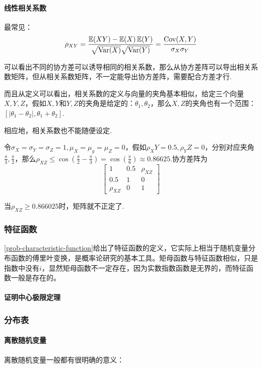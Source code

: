 \paragraph*{线性相关系数}最常见：
$$\rho_{XY}=\frac{\operatorname{\mathbb{E}}(XY)-\operatorname{\mathbb{E}}(X)\operatorname{\mathbb{E}}(Y)}{\sqrt{\operatorname{Var}(X)}\sqrt{\operatorname{Var}(Y)}}=\frac{\operatorname{Cov}(X,Y)}{\sigma_X\sigma_Y}$$

可以看出不同的协方差可以诱导相同的相关系数，那么从协方差阵可以导出相关系数矩阵，但从相关系数矩阵，不一定能导出协方差阵，需要配合方差才行.

而且从定义可以看出，相关系数的定义与向量的夹角基本相似，给定三个向量$X,Y,Z$，假如$X,Y$和$Y,Z$的夹角是给定的：$\theta_1,\theta_2$，那么$X,Z$的夹角也有一个范围：$[|\theta_1-\theta_2|,\theta_1+\theta_2]$.

相应地，相关系数也不能随便设定.

\begin{example}
令$\sigma_X=\sigma_Y=\sigma_Z=1,\mu_X=\mu_y=\mu_Z=0$，假如$\rho_XY=0.5,\rho_YZ=0$，分别对应夹角$\frac{\pi}{3},\frac{\pi}{2}$，那么$\rho_{XZ}\leq\cos\left(\frac{\pi}{2}-\frac{\pi}{3}\right)=\cos\left(\frac{\pi}{6}\right)\approx 0.86625$.协方差阵为
$$\begin{bmatrix}
1 & 0.5 & \rho_{XZ}\\
0.5 & 1 & 0\\
\rho_{XZ}&0&1
\end{bmatrix}$$

当$ \rho_{XZ}\geq 0.866025$时，矩阵就不正定了.

\end{example}
\subsubsection{特征函数}
\ref{prob-characteristic-function}给出了特征函数的定义，它实际上相当于随机变量分布函数的傅里叶变换，是概率论研究的基本工具。矩母函数与特征函数相似，只是指数中没有$i$，显然矩母函数不一定存在，因为实数指数函数是无界的，而特征函数一般是存在的。

\paragraph*{证明中心极限定理}

\subsubsection{分布表}
\paragraph*{离散随机变量}离散随机变量一般都有很明确的意义：

